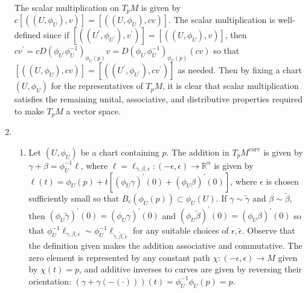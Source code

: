 \documentclass[11pt,leqno]{article}
\theoremstyle{plain}
\theoremstyle{definition}
\numberwithin{equation}{section}
\numberwithin{lem}{section}
\begin{document}
\begin{enumerate}
    The scalar multiplication on $T_pM$ is given by $c[((U,\phi_U),v)] = [((U,\phi_U),cv)]$. The scalar multiplication is well-defined since if $[((U^\prime,\phi_{U^\prime}),v^\prime)] = [((U,\phi_U),v)]$, then $cv^\prime = cD(\phi_{U^\prime}\phi_U^{-1})_{\phi_U(p)}v = D(\phi_{U^\prime}\phi_U^{-1})_{\phi_U(p)}(cv)$ so that $[((U,\phi_U),cv)] = [((U^\prime,\phi_{U^\prime}),cv^\prime)]$ as needed. Then by fixing a chart $(U,\phi_U)$ for the representatives of $T_pM$, it is clear that scalar multiplication satisfies the remaining unital, associative, and distributive properties required to make $T_pM$ a vector space.
    \item \begin{enumerate}
      \item Let $(U,\phi_U)$ be a chart containing $p$. The addition in $T_pM^{\mathrm{curv}}$ is given by $\gamma + \beta = \phi_U^{-1}\ell$, where $\ell = \ell_{\gamma,\beta,\epsilon}\colon (-\epsilon,\epsilon)\to \mathbb R^n$ is given by $\ell(t) = \phi_U(p) + t[(\phi_U\gamma)^\prime(0) + (\phi_U\beta)^\prime(0)]$, where $\epsilon$ is chosen sufficiently small so that $B_\epsilon(\phi_U(p))\subset \phi_U(U)$. If $\gamma\sim\tilde\gamma$ and $\beta\sim\tilde\beta$, then $(\phi_U\tilde\gamma)^\prime(0) = (\phi_U\gamma)^\prime(0)$ and $(\phi_U\tilde\beta)^\prime(0) = (\phi_U\beta)^\prime(0)$ so that $\phi_U^{-1}\ell_{\gamma,\beta,\epsilon}\sim \phi_U^{-1}\ell_{\tilde\gamma,\tilde\beta,\tilde\epsilon}$ for any suitable choices of $\epsilon,\tilde\epsilon$. 
      Observe that the definition given makes the addition associative and commutative. The zero element is represented by any constant path $\chi\colon (-\epsilon,\epsilon)\to M$ given by $\chi(t) = p$, and additive inverses to curves are given by reversing their orientation: $(\gamma + \gamma(-(\cdot)))(t) = \phi_U^{-1}\phi_U(p) = p$.


\end{enumerate}
\end{enumerate}
\end{document}
